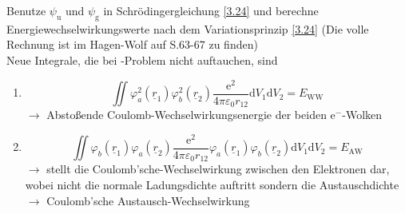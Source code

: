 Benutze $ \psi_{\text{u}}$ und $ \psi_{\text{g}}$ in Schrödingergleichung \ref{3.24} und berechne Energiewechselwirkungswerte nach dem Variationsprinzip \ref{3.24} (Die volle Rechnung ist im Hagen-Wolf auf S.63-67 zu finden)\\
Neue Integrale, die bei -Problem nicht auftauchen, sind
\begin{enumerate}
	\item $$
		\iint \varphi_{a}^2\left( \underline{r}_{1} \right) \varphi_{b}^{2} \left( \underline{r}_{2} \right) \frac{ \mathrm{e}^2}{4 \pi \varepsilon_0 r_{12}} \mathrm{d} V_1 \mathrm{d} V_2 = E_{\text{WW}}
	$$ 
	$\to $ Abstoßende Coulomb-Wechselwirkungsenergie der beiden $\mathrm{e}^{-}$-Wolken
\item 
	$$
	\iint \varphi_{b} \left( \underline{r}_{1} \right) \varphi_{a} \left( \underline{r}_{2} \right) \frac{\mathrm{e}^2}{4 \pi \varepsilon_0 r_{12}} \varphi_{a} \left( \underline{r}_{1} \right) \varphi_{b}\left( \underline{r}_{2} \right) \mathrm{d} V_1 \mathrm{d} V_2 = E_{\text{AW}}
	$$ 
	$\to $ stellt die Coulomb'sche-Wechselwirkung zwischen den Elektronen dar, wobei nicht die normale Ladungsdichte auftritt sondern die Austauschdichte \\ 
	$\to $ Coulomb'sche Austausch-Wechselwirkung
\end{enumerate}

